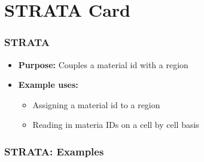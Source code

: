 \section{STRATA Card}

\begin{frame}\frametitle{STRATA}

\begin{itemize}
\item[] \textbf{Purpose:} Couples a material id with a region
\item[] \textbf{Example uses:}
\begin{itemize}
  \item Assigning a material id to a region
  \item Reading in materia IDs on a cell by cell basis
\end{itemize}
\end{itemize}

\end{frame}

\begin{frame}[fragile]\frametitle{STRATA: Examples}

\end{frame}
